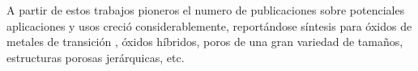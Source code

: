     A partir de estos trabajos pioneros el numero de publicaciones sobre potenciales aplicaciones y usos creció considerablemente, reportándose síntesis para óxidos de metales de transición \cite{Ciesla1996,Ulagappan1996,Antonelli1995}, óxidos híbridos, poros de una gran variedad de tamaños, estructuras porosas jerárquicas, etc.\cite{Soler-Illia2006,Moller1998} %

   






				




